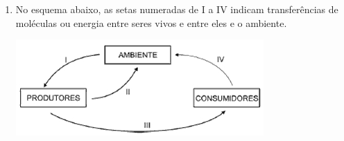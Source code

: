 \documentclass[10pt,a4paper]{article}
\newenvironment{Figure}
  {\par\medskip\noindent\minipage{\linewidth}}
  {\endminipage\par\medskip}
\begin{document}
\begin{multicols}{2}
\begin{enumerate}
	3) \emph{matadores}: carregam enzimas t\'oxicas na cabe\c{c}a e possuem antenas capazes de detectar e reconhecer espermatozoides estranhos. Quando os encontram, despejam neles suas enzimas mortais. Constituem praticamente a outra metade da popula\c{c}\~ao do esperma. \footnote{http://drauziovarella.com.br/sexualidade/a-estrategia-dos-espermatozoides/}\\
	De acordo com o texto acima, assinale a alternativa correta:
		\begin{enumerate}
		\item os espermatozoides pertencentes ao grupo 1 devem possuir um alto n\'umero de mitoc\^ondrias, j\'a que estas organelas s\~ao respons\'aveis pela s\'intese de ATP, mol\'ecula que armazena energia
		\item os espermatozoides pertencentes ao grupo 2 devem possuir um ret\'iculo endoplasm\'atico rugoso muito desenvolvido, uma vez que \'e nessa organela que se realiza a s\'intese de lip\'ideos, que ir\~ao formar a membrana celular
		\item os espermatozoides pertencentes ao grupo 3 devem possuir um ret\'iculo endoplasm\'atico liso muito desenvolvido, uma vez que \'e nessa organela que se realiza a s\'intese das enzimas t\'oxicas, um tipo de prote\'ina
		\item as enzimas t\'oxicas carregadas pelos espermatozoides pertencentes ao grupo 3, citadas no texto, ficam armazenadas dentro do lisossomo e tem a fun\c{c}\~ao de realizar a digest\~ao intracelular
		\item o DNA de um espermatozoides de um dos grupos deve ser necessariamente id\^entico ao de qualquer outro espermatozoide do mesmo grupo
		\end{enumerate}


	\item No esquema abaixo, as setas numeradas de I a IV indicam transfer\^encias de mol\'eculas ou energia entre seres vivos e entre eles e o ambiente.

\begin{Figure}
     \includegraphics[width=\linewidth]{transferencia_bio.jpg}
\end{Figure}


\end{enumerate}
\end{multicols}
\end{document}
